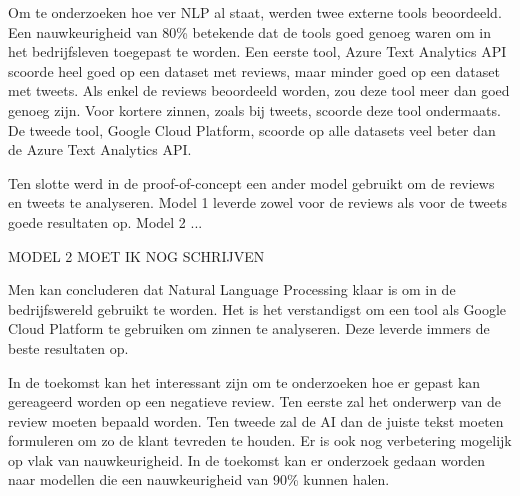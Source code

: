 Om te onderzoeken hoe ver NLP al staat, werden twee externe tools beoordeeld. Een nauwkeurigheid van 80\% betekende dat de tools goed genoeg waren om in het bedrijfsleven toegepast te worden. Een eerste tool, Azure Text Analytics API scoorde heel goed op een dataset met reviews, maar minder goed op een dataset met tweets. Als enkel de reviews beoordeeld worden, zou deze tool meer dan goed genoeg zijn. Voor kortere zinnen, zoals bij tweets, scoorde deze tool ondermaats. De tweede tool, Google Cloud Platform, scoorde op alle datasets veel beter dan de Azure Text Analytics API. 

Ten slotte werd in de proof-of-concept een ander model gebruikt om de reviews en tweets te analyseren. Model 1 leverde zowel voor de reviews als voor de tweets goede resultaten op. Model 2 ...

MODEL 2 MOET IK NOG SCHRIJVEN

Men kan concluderen dat Natural Language Processing klaar is om in de bedrijfswereld gebruikt te worden. Het is het verstandigst om een tool als Google Cloud Platform te gebruiken om zinnen te analyseren. Deze leverde immers de beste resultaten op.

In de toekomst kan het interessant zijn om te onderzoeken hoe er gepast kan gereageerd worden op een negatieve review. Ten eerste zal het onderwerp van de review moeten bepaald worden. Ten tweede zal de AI dan de juiste tekst moeten formuleren om zo de klant tevreden te houden. Er is ook nog verbetering mogelijk op vlak van nauwkeurigheid. In de toekomst kan er onderzoek gedaan worden naar modellen die een nauwkeurigheid van 90\% kunnen halen.







